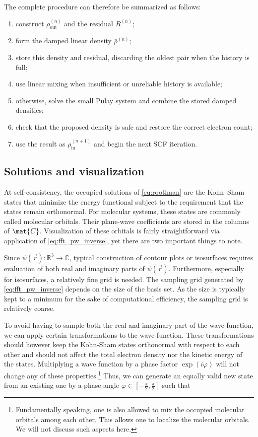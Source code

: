 The complete procedure can therefore be summarized as follows:

\begin{enumerate}
    \item construct \(\rho_{\text{out}}^{(n)}\) and the residual \(R^{(n)}\);
    \item form the damped linear density \(\bar{\rho}^{(n)}\);
    \item store this density and residual, discarding the oldest pair when the history is full;
    \item use linear mixing when insufficient or unreliable history is available;
    \item otherwise, solve the small Pulay system and combine the stored damped densities;
    \item check that the proposed density is safe and restore the correct electron count;
    \item use the result as \(\rho_{\text{in}}^{(n+1)}\) and begin the next SCF iteration.
\end{enumerate}

%
%
%
\subsection{Solutions and visualization}

At self-consistency, the occupied solutions of \cref{eq:roothaan} are the Kohn--Sham states that minimize the energy functional subject to the requirement that the states remain orthonormal. For molecular systems, these states are commonly called molecular orbitals. Their plane-wave coefficients are stored in the columns of \(\mat{C}\). Visualization of these orbitals is fairly straightforward via application of \cref{eq:fft_pw_inverse}, yet there are two important things to note.

Since $\psi(\vec{r}): \mathbb{R}^{3} \rightarrow \mathbb{C}$, typical construction of contour plots or isosurfaces requires evaluation of both real and imaginary parts of $\psi(\vec{r})$. Furthermore, especially for isosurfaces, a relatively fine grid is needed. The sampling grid generated by \cref{eq:fft_pw_inverse} depends on the size of the basis set. As the size is typically kept to a minimum for the sake of computational efficiency, the sampling grid is relatively coarse.

To avoid having to sample both the real and imaginary part of the wave function, we can apply certain transformations to the wave function. These transformations should however keep the Kohn-Sham states orthonormal with respect to each other and should not affect the total electron density nor the kinetic energy of the states. Multiplying a wave function by a phase factor $\exp(i\varphi)$ will not change any of these properties.\footnote{Fundamentally speaking, one is also allowed to mix the occupied molecular orbitals among each other. This allows one to localize the molecular orbitals. We will not discuss such aspects here.} Thus, we can generate an equally valid new state from an existing one by a phase angle $\varphi \in \left[-\frac{\pi}{2},\frac{\pi}{2}\right]$ such that


